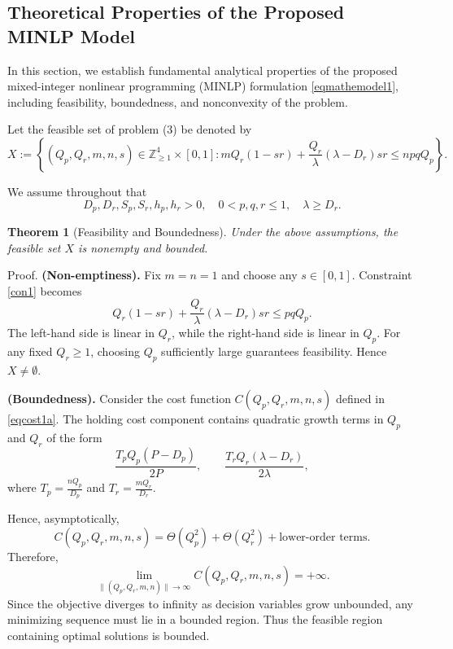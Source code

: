 \documentclass[11pt]{article}
\newtheorem{theorem}{Theorem}[section]
\newcommand{\proofbox}{\hspace{\fill}{$\Box$}}
\newenvironment{proof}{Proof.}{\proofbox}
\begin{document}
\subsection{Theoretical Properties of the Proposed MINLP Model}

In this section, we establish fundamental analytical properties of the proposed
mixed-integer nonlinear programming (MINLP) formulation \eqref{eqmathemodel1}, including feasibility,
boundedness, and nonconvexity of the problem.

\medskip

\noindent
Let the feasible set of problem (3) be denoted by
\[
X := \left\{ (Q_p,Q_r,m,n,s) \in \mathbb{Z}_{\ge1}^4 \times [0,1] :
mQ_r(1-sr) + \frac{Q_r}{\lambda}(\lambda-D_r)sr \le npqQ_p \right\}.
\]

We assume throughout that
\[
D_p,D_r,S_p,S_r,h_p,h_r > 0, \quad
0 < p,q,r \le 1, \quad \lambda \ge D_r.
\]


\begin{theorem}[Feasibility and Boundedness]\label{theorem1}
Under the above assumptions, the feasible set $X$ is nonempty and bounded.
\end{theorem}

\begin{proof}
\textbf{(Non-emptiness).}
Fix $m=n=1$ and choose any $s\in[0,1]$.
Constraint \eqref{con1} becomes
\[
Q_r(1-sr) + \frac{Q_r}{\lambda}(\lambda-D_r)sr \le pqQ_p.
\]
The left-hand side is linear in $Q_r$, while the right-hand side
is linear in $Q_p$. For any fixed $Q_r\ge1$, choosing $Q_p$
sufficiently large guarantees feasibility. Hence $X\neq\emptyset$.

\medskip

\textbf{(Boundedness).}
Consider the cost function $C(Q_p,Q_r,m,n,s)$ defined in \eqref{eqcost1a}.
The holding cost component contains quadratic growth terms in $Q_p$
and $Q_r$ of the form
\[
\frac{T_pQ_p(P-D_p)}{2P}, \qquad
\frac{T_rQ_r(\lambda-D_r)}{2\lambda},
\]
where $T_p = \frac{nQ_p}{D_p}$ and $T_r = \frac{mQ_r}{D_r}$.

Hence, asymptotically,
\[
C(Q_p,Q_r,m,n,s)
= \Theta(Q_p^2) + \Theta(Q_r^2) + \text{lower-order terms}.
\]
Therefore,
\[
\lim_{\|(Q_p,Q_r,m,n)\|\to\infty} C(Q_p,Q_r,m,n,s) = +\infty.
\]
Since the objective diverges to infinity as decision variables
grow unbounded, any minimizing sequence must lie in a bounded region.
Thus the feasible region containing optimal solutions is bounded.
\end{proof}
\end{document}
